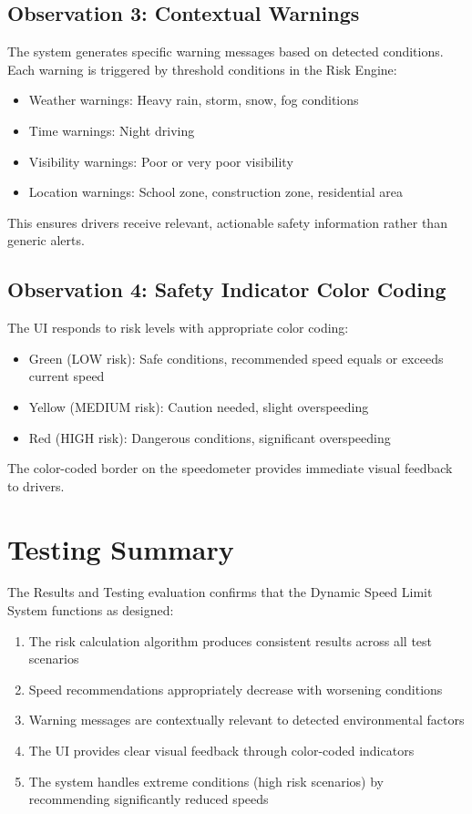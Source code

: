 \subsection{Observation 3: Contextual Warnings}
The system generates specific warning messages based on detected conditions. Each warning is triggered by threshold conditions in the Risk Engine:
\begin{itemize}
    \item Weather warnings: Heavy rain, storm, snow, fog conditions
    \item Time warnings: Night driving
    \item Visibility warnings: Poor or very poor visibility
    \item Location warnings: School zone, construction zone, residential area
\end{itemize}
This ensures drivers receive relevant, actionable safety information rather than generic alerts.

\subsection{Observation 4: Safety Indicator Color Coding}
The UI responds to risk levels with appropriate color coding:
\begin{itemize}
    \item Green (LOW risk): Safe conditions, recommended speed equals or exceeds current speed
    \item Yellow (MEDIUM risk): Caution needed, slight overspeeding
    \item Red (HIGH risk): Dangerous conditions, significant overspeeding
\end{itemize}
The color-coded border on the speedometer provides immediate visual feedback to drivers.

\section{Testing Summary}
The Results and Testing evaluation confirms that the Dynamic Speed Limit System functions as designed:
\begin{enumerate}
    \item The risk calculation algorithm produces consistent results across all test scenarios
    \item Speed recommendations appropriately decrease with worsening conditions
    \item Warning messages are contextually relevant to detected environmental factors
    \item The UI provides clear visual feedback through color-coded indicators
    \item The system handles extreme conditions (high risk scenarios) by recommending significantly reduced speeds
\end{enumerate}

